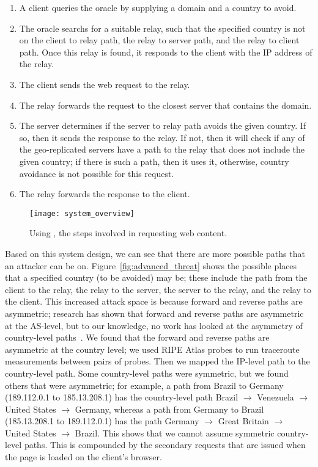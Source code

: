 \begin{enumerate}
\item A client queries the oracle by supplying a domain and a country to avoid.  
\item The oracle searchs for a suitable relay, such that the specified country is not on the client to relay path, the relay to server path, and the relay to client path.  Once this relay is found, it responds to the client with the IP address of the relay.
\item The client sends the web request to the relay.
\item The relay forwards the request to the closest server that contains the domain.
\item The server determines if the server to relay path avoids the given country.  If so, then it sends the response to the relay. If not, then it will check if any of the geo-replicated servers have a path to the relay that does not include the given country; if there is such a path, then it uses it, otherwise, country avoidance is not possible for this request.
\item The relay forwards the response to the client.
\end{enumerate}

\begin{figure}[t]
\centering
\texttt{[image: system\_overview]}
\caption{Using \system{}, the steps involved in requesting web content.}
\label{fig:overview}
\end{figure}

Based on this system design, we can see that there are more possible paths that an attacker can be on.  Figure~\ref{fig:advanced_threat} shows the possible places that a specified country (to be avoided) may be; these include the path from the client to the relay, the relay to the server, the server to the relay, and the relay to the client.  This increased attack space is because forward and reverse paths are asymmetric; research has shown that forward and reverse paths are asymmetric at the AS-level, but to our knowledge, no work has looked at the asymmetry of country-level paths~\cite{he2005routing}.  We found that the forward and reverse paths are asymmetric at the country level; we used RIPE Atlas probes to run traceroute measurements between pairs of probes.  Then we mapped the IP-level path to the country-level path.  Some country-level paths were symmetric, but we found others that were asymmetric; for example, a path from Brazil to Germany (189.112.0.1 to 185.13.208.1) has the country-level path Brazil $\rightarrow$ Venezuela $\rightarrow$ United States $\rightarrow$ Germany, whereas a path from Germany to Brazil (185.13.208.1 to 189.112.0.1) has the path Germany $\rightarrow$ Great Britain $\rightarrow$ United States $\rightarrow$ Brazil.  This shows that we cannot assume symmetric country-level paths. This is compounded by the secondary requests that are issued when the page is loaded on the client's browser.  

